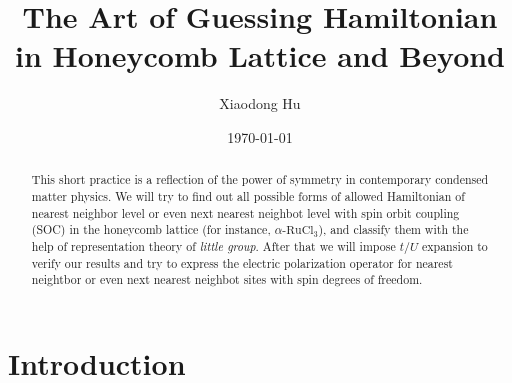 \documentclass[10pt,nofootinbib]{revtex4}
\begin{document}
\title{The Art of Guessing Hamiltonian in Honeycomb Lattice and Beyond}%

\author{Xiaodong Hu}

\date{\today}


\begin{abstract}
	This short practice is a reflection of the power of symmetry in contemporary condensed matter physics. We will try to find out all possible forms of allowed Hamiltonian of nearest neighbor level or even next nearest neighbot level with spin orbit coupling (SOC) in the honeycomb lattice (for instance, $\alpha$-$\mathrm{RuCl}_3$), and classify them with the help of representation theory of \emph{little group}. After that we will impose $t/U$ expansion to verify our results and try to express the electric polarization operator for nearest neightbor or even next nearest neighbot sites with spin degrees of freedom.
\end{abstract}
\maketitle
\tableofcontents
\section{Introduction}
\end{document}
